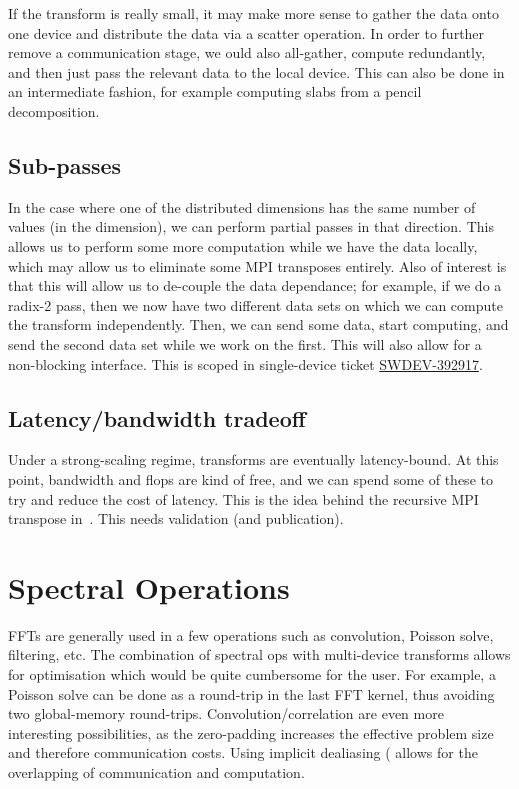 \documentclass[12pt]{article}
\renewcommand{\(}{\left(}
\renewcommand{\)}{\right)}
\begin{document}
If the transform is really small, it may make more sense to gather the
data onto one device and distribute the data via a scatter operation.
In order to further remove a communication stage, we ould also
all-gather, compute redundantly, and then just pass the relevant data
to the local device.  This can also be done in an intermediate
fashion, for example computing slabs from a pencil decomposition.

\subsection{Sub-passes}
\label{subpasses}

In the case where one of the distributed dimensions has the same
number of values (in the dimension), we can perform partial passes in
that direction.  This allows us to perform some more computation while
we have the data locally, which may allow us to eliminate some MPI
transposes entirely.  Also of interest is that this will allow us to
de-couple the data dependance; for example, if we do a radix-2 pass,
then we now have two different data sets on which we can compute the
transform independently.  Then, we can send some data, start
computing, and send the second data set while we work on the first.
This will also allow for a non-blocking interface.  This is scoped in
single-device ticket
\href{https://ontrack-internal.amd.com/browse/SWDEV-392917}{SWDEV-392917}.



\subsection{Latency/bandwidth tradeoff}

Under a strong-scaling regime, transforms are eventually
latency-bound.  At this point, bandwidth and flops are kind of free,
and we can spend some of these to try and reduce the cost of latency.
This is the idea behind the recursive MPI transpose
in~\cite{bowmanroberts2015adaptive}.  This needs validation (and
publication).


\section{Spectral Operations}
\label{spectralops}

FFTs are generally used in a few operations such as convolution,
Poisson solve, filtering, etc.  The combination of spectral ops with
multi-device transforms allows for optimisation which would be quite
cumbersome for the user.  For example, a Poisson solve can be done as
a round-trip in the last FFT kernel, thus avoiding two global-memory
round-trips.  Convolution/correlation are even more interesting
possibilities, as the zero-padding increases the effective problem
size and therefore communication costs.  Using implicit dealiasing
(\cite{dealias2} allows for the overlapping of communication and
computation.
\end{document}
